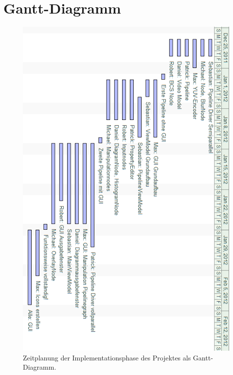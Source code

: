 \section{Gantt-Diagramm}

\begin{figure}[h!]
\begin{center}
\includegraphics[height=0.7\textheight]{Diagrams/ganttchart.png}
\end{center}
\caption{Zeitplanung der Implementationsphase des Projektes als Gantt-Diagramm.}
\end{figure}